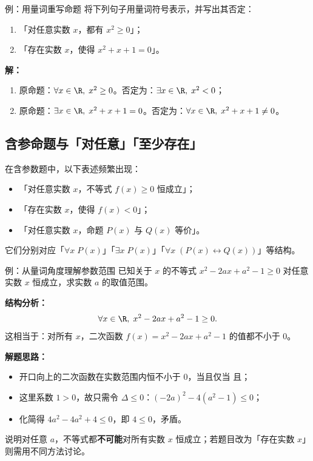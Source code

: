 \documentclass[a4paper,11pt]{ctexart}
\begin{document}
\begin{examplebox}{例：用量词重写命题}
  将下列句子用量词符号表示，并写出其否定：
  \begin{enumerate}
    \item 「对任意实数 $x$，都有 $x^2\ge0$」；
    \item 「存在实数 $x$，使得 $x^2+x+1=0$」。
  \end{enumerate}
  \textbf{解：}
  \begin{enumerate}
    \item 原命题：$\forall x\in\R,\;x^2\ge0$。否定为：$\exists x\in\R,\;x^2<0$；
    \item 原命题：$\exists x\in\R,\;x^2+x+1=0$。否定为：$\forall x\in\R,\;x^2+x+1\ne0$。
  \end{enumerate}
\end{examplebox}

\subsection{含参命题与「对任意」「至少存在」}

\begin{sideinfobox}[title={典型高考表述}]%
  在含参数题中，以下表述频繁出现：
  \begin{itemize}
    \item 「对任意实数 $x$，不等式 $f(x)\ge0$ 恒成立」；
    \item 「存在实数 $x$，使得 $f(x)<0$」；
    \item 「对任意实数 $x$，命题 $P(x)$ 与 $Q(x)$ 等价」。
  \end{itemize}
  它们分别对应「$\forall x\;P(x)$」「$\exists x\;P(x)$」「$\forall x\;(P(x)\leftrightarrow Q(x))$」等结构。
\end{sideinfobox}

\begin{examplebox}{例：从量词角度理解参数范围}
  已知关于 $x$ 的不等式 $x^2-2ax+a^2-1\ge0$ 对任意实数 $x$ 恒成立，求实数 $a$ 的取值范围。

  \textbf{结构分析：}
  \[
    \forall x\in\R,\;x^2-2ax+a^2-1\ge0.
  \]
  这相当于：对所有 $x$，二次函数 $f(x)=x^2-2ax+a^2-1$ 的值都不小于 $0$。

  \textbf{解题思路：}
  \begin{itemize}
    \item 开口向上的二次函数在实数范围内恒不小于 $0$，当且仅当 且；
    \item 这里系数 $1>0$，故只需令 $\Delta\le0$：$(-2a)^2-4(a^2-1)\le0$；
    \item 化简得 $4a^2-4a^2+4\le0$，即 $4\le0$，矛盾。
  \end{itemize}
  说明对任意 $a$，不等式都\textbf{不可能}对所有实数 $x$ 恒成立；若题目改为「存在实数 $x$」则需用不同方法讨论。
\end{examplebox}
\end{document}

